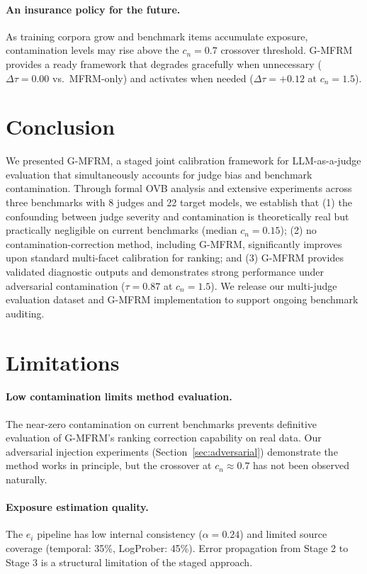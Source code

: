 \documentclass[11pt]{article}
\begin{document}
\paragraph{An insurance policy for the future.}
As training corpora grow and benchmark items accumulate exposure, contamination levels may rise above the $c_n = 0.7$ crossover threshold.
G-MFRM provides a ready framework that degrades gracefully when unnecessary ($\Delta\tau = 0.00$ vs.\ MFRM-only) and activates when needed ($\Delta\tau = +0.12$ at $c_n = 1.5$).

\section{Conclusion}

We presented G-MFRM, a staged joint calibration framework for LLM-as-a-judge evaluation that simultaneously accounts for judge bias and benchmark contamination.
Through formal OVB analysis and extensive experiments across three benchmarks with 8 judges and 22 target models, we establish that (1) the confounding between judge severity and contamination is theoretically real but practically negligible on current benchmarks (median $c_n = 0.15$); (2) no contamination-correction method, including G-MFRM, significantly improves upon standard multi-facet calibration for ranking; and (3) G-MFRM provides validated diagnostic outputs and demonstrates strong performance under adversarial contamination ($\tau = 0.87$ at $c_n = 1.5$).
We release our multi-judge evaluation dataset and G-MFRM implementation to support ongoing benchmark auditing.

\section*{Limitations}

\paragraph{Low contamination limits method evaluation.}
The near-zero contamination on current benchmarks prevents definitive evaluation of G-MFRM's ranking correction capability on real data.
Our adversarial injection experiments (Section~\ref{sec:adversarial}) demonstrate the method works in principle, but the crossover at $c_n \approx 0.7$ has not been observed naturally.

\paragraph{Exposure estimation quality.}
The $e_i$ pipeline has low internal consistency ($\alpha = 0.24$) and limited source coverage (temporal: 35\%, LogProber: 45\%).
Error propagation from Stage 2 to Stage 3 is a structural limitation of the staged approach.
\end{document}
